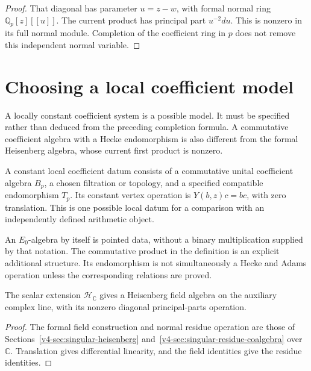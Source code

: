 \begin{proof}
That diagonal has parameter \(u=z-w\), with formal normal
ring \(\mathbb Q_p[z][[u]]\). The current product has principal
part \(u^{-2}du\). This is nonzero in its full normal module.
Completion of the coefficient ring in \(p\) does not remove
this independent normal variable.
\end{proof}

\section{Choosing a local coefficient model}
\label{v4-arith:dk:E0-local-model}

A locally constant coefficient system is a possible model.
It must be specified rather than deduced from the preceding
completion formula. A commutative coefficient algebra with a
Hecke endomorphism is also different from the formal Heisenberg
algebra, whose current first product is nonzero.

\begin{definition}\label{v4-arith:def:E0-local-factor}
A constant local coefficient datum consists of a commutative
unital coefficient algebra \(B_p\), a chosen filtration or
topology, and a specified compatible endomorphism \(T_p\).
Its constant vertex operation is \(Y(b,z)c=bc\), with zero
translation. This is one possible local datum for a comparison
with an independently defined arithmetic object.
\end{definition}

An \(E_0\)-algebra by itself is pointed data, without a binary
multiplication supplied by that notation. The commutative product
in the definition is an explicit additional structure.
Its endomorphism is not simultaneously a Hecke and Adams
operation unless the corresponding relations are proved.

\begin{theorem}
\label{v4-arith:thm:archimedean-is-holomorphic}
The scalar extension \(\mathcal H_{\mathbb C}\) gives a
Heisenberg field algebra on the auxiliary complex line, with
its nonzero diagonal principal-parts operation.
\end{theorem}

\begin{proof}
The formal field construction and normal residue operation are
those of Sections~\ref{v4-sec:singular-heisenberg}
and~\ref{v4-sec:singular-residue-coalgebra} over \(\mathbb C\).
Translation gives differential linearity, and the field identities
give the residue identities.
\end{proof}

